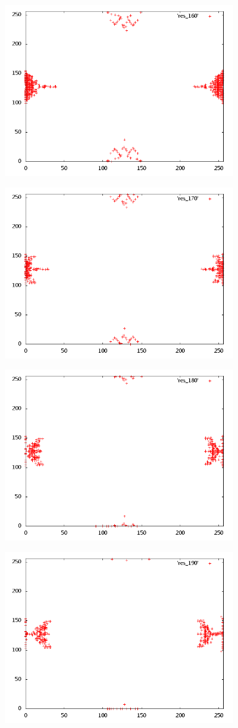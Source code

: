\begin{center}
\includegraphics[width=4in]{res_160.png}
\end{center}
\begin{center}
\includegraphics[width=4in]{res_170.png}
\end{center}
\begin{center}
\includegraphics[width=4in]{res_180.png}
\end{center}
\begin{center}
\includegraphics[width=4in]{res_190.png}
\end{center}

